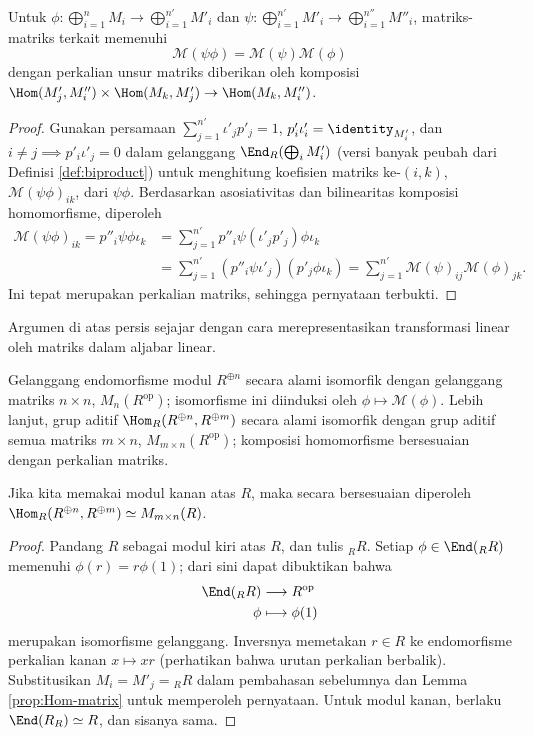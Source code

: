 \begin{lemma}\label{prop:Hom-matrix}
	Untuk $\phi: \bigoplus_{i=1}^n M_i \to \bigoplus_{i=1}^{n'} M'_i$ dan $\psi: \bigoplus_{i=1}^{n'} M'_i \to \bigoplus_{i=1}^{n''} M''_i$, matriks-matriks terkait memenuhi
	\[ \mathcal{M}(\psi\phi) = \mathcal{M}(\psi) \mathcal{M}(\phi) \]
	dengan perkalian unsur matriks diberikan oleh komposisi $\Hom(M'_j, M''_i) \times \Hom(M_k, M'_j) \to \Hom(M_k, M''_i)$.
\end{lemma}
\begin{proof}
	Gunakan persamaan $\sum_{j=1}^{n'} \iota'_j p'_j = 1$, $p'_i \iota'_i = \identity_{M'_i}$, dan $i \neq j \implies p'_i \iota'_j = 0$ dalam gelanggang $\End_R(\bigoplus_i M'_i)$ (versi banyak peubah dari Definisi \ref{def:biproduct}) untuk menghitung koefisien matriks ke-$(i, k)$, $\mathcal{M}(\psi\phi)_{ik}$, dari $\psi\phi$. Berdasarkan asosiativitas dan bilinearitas komposisi homomorfisme, diperoleh
	\begin{align*}
		\mathcal{M}(\psi\phi)_{ik} = p''_i \psi\phi \iota_k & = \sum_{j=1}^{n'} p''_i \psi (\iota'_j p'_j) \phi \iota_k \\
		& = \sum_{j=1}^{n'} (p''_i \psi \iota'_j) (p'_j \phi \iota_k) = \sum_{j=1}^{n'} \mathcal{M}(\psi)_{ij} \mathcal{M}(\phi)_{jk}.
	\end{align*}
	Ini tepat merupakan perkalian matriks, sehingga pernyataan terbukti.
\end{proof}

Argumen di atas persis sejajar dengan cara merepresentasikan transformasi linear oleh matriks dalam aljabar linear.
\begin{proposition}\label{prop:End-matrix}
	Gelanggang endomorfisme modul $R^{\oplus n}$ secara alami isomorfik dengan gelanggang matriks $n \times n$, $M_n(R^\text{op})$; isomorfisme ini diinduksi oleh $\phi \mapsto \mathcal{M}(\phi)$. Lebih lanjut, grup aditif $\Hom_R(R^{\oplus n}, R^{\oplus m})$ secara alami isomorfik dengan grup aditif semua matriks $m \times n$, $M_{m \times n}(R^\text{op})$; komposisi homomorfisme bersesuaian dengan perkalian matriks.
	
	Jika kita memakai modul kanan atas $R$, maka secara bersesuaian diperoleh $\Hom_R(R^{\oplus n}, R^{\oplus m}) \simeq M_{m \times n}(R)$.
\end{proposition}
\begin{proof}
	Pandang $R$ sebagai modul kiri atas $R$, dan tulis ${}_R R$. Setiap $\phi \in \End({}_R R)$ memenuhi $\phi(r) = r\phi(1)$; dari sini dapat dibuktikan bahwa
	\begin{align*}
		\End({}_R R) & \longrightarrow R^\text{op} \\
		\phi & \longmapsto \phi(1)
	\end{align*}
	merupakan isomorfisme gelanggang. Inversnya memetakan $r \in R$ ke endomorfisme perkalian kanan $x \mapsto xr$ (perhatikan bahwa urutan perkalian berbalik). Substitusikan $M_i = M'_j = {}_R R$ dalam pembahasan sebelumnya dan Lemma \ref{prop:Hom-matrix} untuk memperoleh pernyataan. Untuk modul kanan, berlaku $\End(R_R) \simeq R$, dan sisanya sama.
\end{proof}

